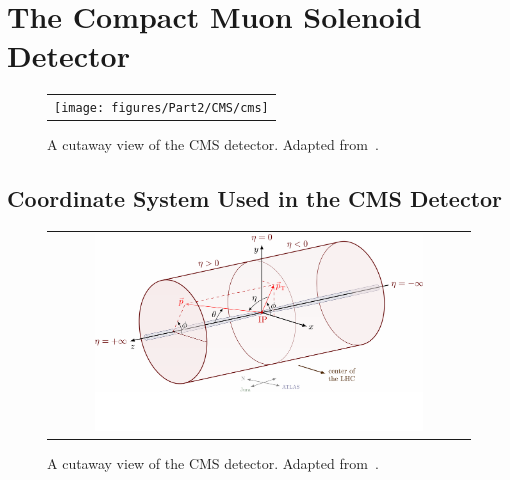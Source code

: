 \chapter{The Compact Muon Solenoid Detector}
\label{chap:CMS}

\begin{figure}[tbh!]
 \begin{center}
 \begin{tabular}{c}
 \texttt{[image: figures/Part2/CMS/cms]}
 \end{tabular}
 \caption{A cutaway view of the \ac{CMS} detector. Adapted from~\cite{Sakuma:2013jqa}.}
 \label{fig:CMS}
 \end{center}
\end{figure}

\section{Coordinate System Used in the CMS Detector}

\begin{figure}[tbh!]
 \begin{center}
 \begin{tabular}{c}
 \includegraphics[width=0.8\textwidth]{figures/Part2/CMS/axis3D_CMS-004}
 \end{tabular}
 \caption{A cutaway view of the \ac{CMS} detector. Adapted from~\cite{tikz:3D}.}
 \label{fig:axis3D}
 \end{center}
\end{figure}

